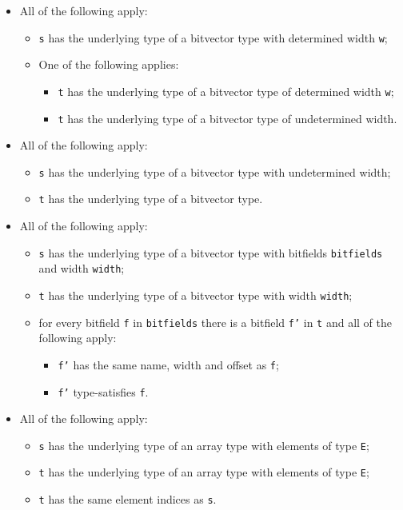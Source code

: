 \documentclass{book}
\begin{document}
\begin{itemize}
  \item All of the following apply:
    \begin{itemize}
    \item \texttt{s} has the underlying type of a bitvector type with determined width \texttt{w};
    \item One of the following applies:
      \begin{itemize}
      \item \texttt{t} has the underlying type of a bitvector type of determined width \texttt{w};
      \item \texttt{t} has the underlying type of a bitvector type of undetermined width.
      \end{itemize}
    \end{itemize}

  \item All of the following apply:
    \begin{itemize}
    \item \texttt{s} has the underlying type of a bitvector type with undetermined width;
    \item \texttt{t} has the underlying type of a bitvector type.
    \end{itemize}

  \item All of the following apply:
    \begin{itemize}
    \item \texttt{s} has the underlying type of a bitvector type with bitfields \texttt{bitfields} and width \texttt{width};
    \item \texttt{t} has the underlying type of a bitvector type with width \texttt{width};
    \item for every bitfield \texttt{f} in \texttt{bitfields} there is a bitfield \texttt{f'} in \texttt{t} and
      all of the following apply:
      \begin{itemize}
      \item \texttt{f'} has the same name, width and offset as \texttt{f};
      \item \texttt{f'} type-satisfies \texttt{f}.
      \end{itemize}
    \end{itemize}

  \item All of the following apply:
    \begin{itemize}
    \item \texttt{s} has the underlying type of an array type with elements of type \texttt{E};
    \item \texttt{t} has the underlying type of an array type with elements of type \texttt{E};
    \item \texttt{t} has the same element indices as \texttt{s}.
    \end{itemize}


\end{itemize}
\end{document}
